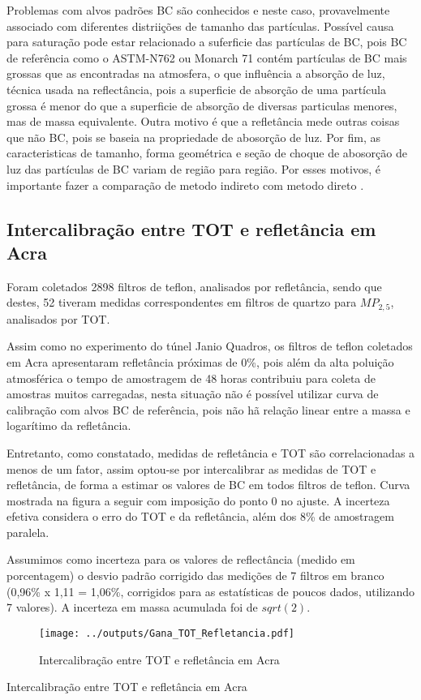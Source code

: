 Problemas com alvos padrões BC são conhecidos e neste caso, 
provavelmente associado com diferentes distriições de tamanho das partículas.
Possível causa para saturação pode estar relacionado a suferficie das partículas 
de BC, pois BC de referência como o ASTM-N762 ou Monarch 71 contém partículas
de BC mais grossas que as encontradas na atmosfera, o que influência a 
absorção de luz, técnica usada na reflectância, pois a superficie de absorção
de uma partícula grossa é menor do que a superficie de absorção de diversas
particulas menores, mas de massa equivalente. Outra motivo é que a refletância
mede outras coisas que não BC, pois se baseia na propriedade de abosorção de luz.
Por fim, as caracteristicas de tamanho, forma geométrica e seção de choque
de abosorção de luz das partículas de BC variam de região para região.
Por esses motivos, é importante fazer a comparação de metodo indireto com 
metodo direto \citep{quincey2007}.

\newpage
\subsection{Intercalibração entre TOT e refletância em Acra}

Foram coletados 2898 filtros de teflon, analisados por refletância,
sendo que destes, 52 tiveram medidas correspondentes em filtros de quartzo 
para $MP_{2,5}$, analisados por TOT.

Assim como no experimento do túnel Janio Quadros, os filtros de teflon 
coletados em Acra apresentaram refletância próximas de 0\%, pois além 
da alta poluição atmosférica o tempo de amostragem de 48 horas contribuiu 
para coleta de amostras muitos carregadas, nesta situação não é possível 
utilizar curva de calibração com alvos BC de referência, pois
não hã relação linear entre a massa e logarítimo da refletância.

Entretanto, como constatado, medidas de refletância e TOT são correlacionadas 
a menos de um fator, assim optou-se por intercalibrar as medidas de 
TOT e refletância, de forma a estimar os valores de BC em todos filtros
de teflon. Curva mostrada na figura a seguir com imposição do ponto 0 no ajuste.
A incerteza efetiva considera o erro do TOT e da refletância, além dos 8\% de 
amostragem paralela. 

Assumimos como incerteza para os valores de reflectância (medido em porcentagem)
o desvio padrão corrigido das medições de 7 filtros em branco 
(0,96\% x 1,11 = 1,06\%, corrigidos para as estatísticas de poucos dados, 
utilizando 7 valores). A incerteza em massa acumulada foi de $sqrt(2)$.

\begin{figure}[H]
\begin{center}
  \texttt{[image: ../outputs/Gana\_TOT\_Refletancia.pdf]}
  \caption{Intercalibração entre TOT e refletância em Acra}
\end{center}
\end{figure}

\begin{table}[H]
  \centering
  \small
   
   \caption{Intercalibração entre TOT e refletância em Acra}
\end{table} 


